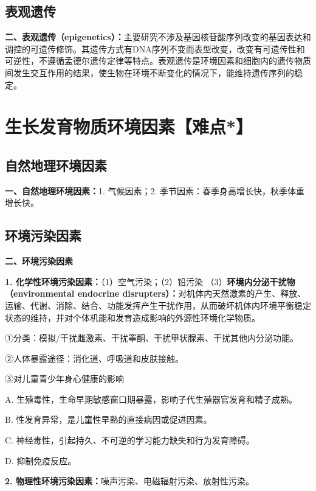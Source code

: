 \subsection{表观遗传}

\begin{keybox}
\textbf{二、表观遗传（epigenetics）：}主要研究不涉及基因核苷酸序列改变的基因表达和调控的可遗传修饰。其遗传方式有DNA序列不变而表型改变，改变有可遗传性和可逆性，不遵循孟德尔遗传定律等特点。表观遗传是环境因素和细胞内的遗传物质间发生交互作用的结果，使生物在环境不断变化的情况下，能维持遗传序列的稳定。
\end{keybox}

\section{生长发育物质环境因素\textbf{【难点*】}}

\subsection{自然地理环境因素}

\begin{keybox}
\textbf{一、自然地理环境因素：}1. 气候因素；2. 季节因素：春季身高增长快，秋季体重增长快。
\end{keybox}

\subsection{环境污染因素}

\begin{keybox}
\textbf{二、环境污染因素}

\textbf{1. 化学性环境污染因素：}（1）空气污染；（2）铅污染
（3）\textbf{环境内分泌干扰物（environmental endocrine disrupters）：}对机体内天然激素的产生、释放、运输、代谢、消除、结合、功能发挥产生干扰作用，从而破坏机体内环境平衡稳定状态的维持，并对个体机能和发育造成影响的外源性环境化学物质。

①分类：模拟/干扰雌激素、干扰睾酮、干扰甲状腺素、干扰其他内分泌功能。

②人体暴露途径：消化道、呼吸道和皮肤接触。

③对儿童青少年身心健康的影响

A. 生殖毒性，生命早期敏感窗口期暴露，影响子代生殖器官发育和精子成熟。

B. 性发育异常，是儿童性早熟的直接病因或促进因素。

C. 神经毒性，引起持久、不可逆的学习能力缺失和行为发育障碍。

D. 抑制免疫反应。

\textbf{2. 物理性环境污染因素：}噪声污染、电磁辐射污染、放射性污染。
\end{keybox}

